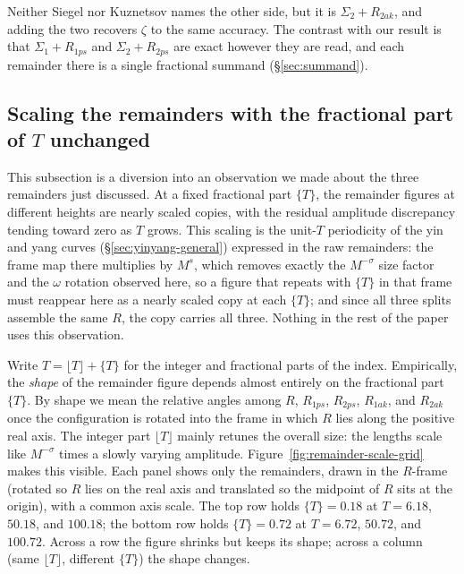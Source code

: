 \documentclass[11pt]{article}
\theoremstyle{definition}
\begin{document}
Neither Siegel
nor Kuznetsov names the other side, but it is $\Sigma_2+R_{2ak}$, and adding the
two recovers $\zeta$ to the same accuracy. The contrast with our result is that
$\Sigma_1+R_{1ps}$ and $\Sigma_2+R_{2ps}$ are exact however they are read, and
each remainder there is a single fractional summand
(\S\ref{sec:summand}).

\subsection{Scaling the remainders with the fractional part of \texorpdfstring{$T$}{T} unchanged}\label{sec:remainder-scaling}

This subsection is a diversion into an observation we made about the
three remainders just discussed. At a fixed fractional part $\{T\}$,
the remainder figures at different heights are nearly scaled copies, with
the residual amplitude discrepancy tending toward zero as $T$ grows.
This scaling is the unit-$T$
periodicity of the yin and yang curves (\S\ref{sec:yinyang-general})
expressed in the raw remainders: the frame map there multiplies by $M^{s}$, which
removes exactly the $M^{-\sigma}$ size factor and the $\omega$ rotation
observed here, so a figure that repeats with $\{T\}$ in that frame must
reappear here as a nearly scaled copy at each $\{T\}$; and since all three
splits assemble the same $R$, the copy carries all three. Nothing in the
rest of the paper uses this observation.

Write $T=\lfloor T\rfloor+\{T\}$ for the integer and fractional parts of the
index. Empirically, the \emph{shape} of the remainder figure depends almost
entirely on the fractional part $\{T\}$. By shape we mean the relative angles
among $R$, $R_{1ps}$, $R_{2ps}$, $R_{1ak}$, and $R_{2ak}$ once the
configuration is rotated into the frame in which $R$ lies along the positive
real axis. The integer part $\lfloor T\rfloor$ mainly retunes the overall
size: the lengths scale like $M^{-\sigma}$ times a
slowly varying amplitude. Figure~\ref{fig:remainder-scale-grid} makes this
visible. Each panel shows only the remainders, drawn in the $R$-frame
(rotated so $R$ lies on the real axis and translated so the midpoint of $R$
sits at the origin), with a common axis scale. The top row holds
$\{T\}=0.18$ at $T=6.18$, $50.18$, and $100.18$; the bottom row holds
$\{T\}=0.72$ at $T=6.72$, $50.72$, and $100.72$. Across a row the figure
shrinks but keeps its shape; across a column (same $\lfloor T\rfloor$,
different $\{T\}$) the shape changes.
\end{document}
